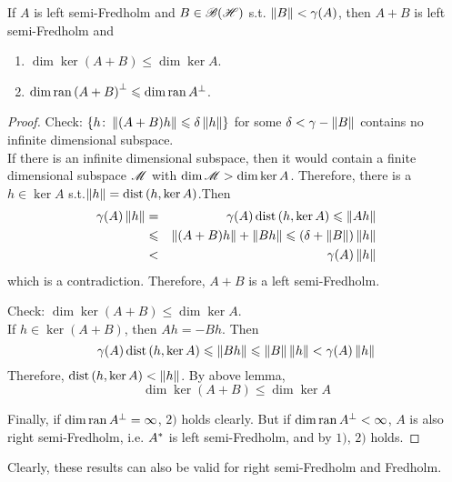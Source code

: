 \begin{lem}
	If $A$ is left semi-Fredholm and $B \in \mathscr{B(H)}$ s.t. $\left\lVert B\right\lVert < \gamma(A)$, then $A+B$ is left semi-Fredholm and 
	\begin{enumerate}[label=\arabic*)]
		\item $\dim{\ker{(A+B)}} \leqslant \dim{\ker{A}}$.
		\item $\dim{\operatorname{ran}{(A+B)}^{\bot}} \leqslant \dim{\operatorname{ran}{A}^{\bot}}$.
	\end{enumerate}
\end{lem}
\begin{proof}
	Check: $\{h \colon \left\lVert(A+B)h\right\lVert \leqslant \delta \left\lVert h\right\lVert\}$ for some $\delta < \gamma - \left\lVert B\right\lVert$ contains no infinite dimensional subspace. \\
	If there is an infinite dimensional subspace, then it would contain a finite dimensional subspace $\mathscr{M}$ with $\dim{\mathscr{M}} > \dim{\ker{A}}$. Therefore, there is a $h \in \ker{A}$ s.t.$\left\lVert h\right\lVert = \operatorname{dist}{(h,\ker{A})}$.Then
	\begin{eqnarray*}
		\gamma(A)\left\lVert h\right\lVert &=& \gamma(A) \operatorname{dist}{(h,\ker{A})} \leqslant \left\lVert Ah\right\lVert \\
		&\leqslant& \left\lVert(A+B)h\right\lVert +\left\lVert Bh\right\lVert \leqslant (\delta+\left\lVert B\right\lVert)\left\lVert h\right\lVert \\
		&<& \gamma(A)\left\lVert h\right\lVert
	\end{eqnarray*}
	which is a contradiction. Therefore, $A+B$ is a left semi-Fredholm.

	\item Check: $\dim{\ker{(A+B)}} \leqslant \dim{\ker{A}}$. \\
	If $h \in \ker{(A+B)}$, then $Ah = -Bh$. Then
	\begin{equation*}
		\gamma(A)\operatorname{dist}{(h,\ker{A})} \leqslant \left\lVert Bh\right\lVert \leqslant \left\lVert B\right\lVert\left\lVert h\right\lVert < \gamma(A) \left\lVert h\right\lVert
	\end{equation*}
	Therefore, $\operatorname{dist}{(h,\ker{A})} < \left\lVert h\right\lVert$. By above lemma,
	\begin{equation*}
		\dim{\ker{(A+B)}} \leqslant \dim{\ker{A}}
	\end{equation*}

	\item Finally, if $\dim{\operatorname{ran}{A}^{\bot}} = \infty$, $2)$ holds clearly. But if $\dim{\operatorname{ran}{A}^{\bot}} < \infty$, $A$ is also right semi-Fredholm, i.e. $A^{*}$ is left semi-Fredholm, and by $1)$, $2)$ holds.
\end{proof}
\begin{rem}
	Clearly, these results can also be valid for right semi-Fredholm and Fredholm.
\end{rem}

